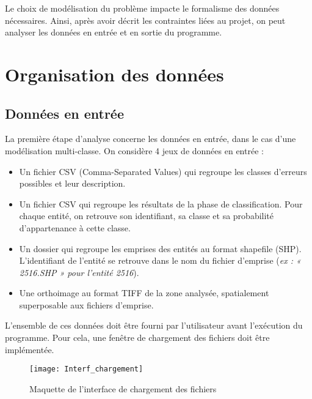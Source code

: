 Le choix de modélisation du problème impacte le formalisme des données nécessaires. Ainsi, après avoir décrit les contraintes liées au projet, on peut analyser les données en entrée et en sortie du programme.\newline

\section{Organisation des données}

\subsection{Données en entrée}

La première étape d'analyse concerne les données en entrée, dans le cas d'une modélisation multi-classe. On considère 4 jeux de données en entrée :
\begin{itemize}[label=$\rightarrow$]
	\item Un fichier CSV (Comma-Separated Values) qui regroupe les classes d’erreurs possibles et leur description.
	\item Un fichier CSV qui regroupe les résultats de la phase de classification. Pour chaque entité, on retrouve son identifiant, sa classe et sa probabilité d’appartenance à cette classe.
	\item Un dossier qui regroupe les emprises des entités au format shapefile (SHP). L’identifiant de l’entité se retrouve dans le nom du fichier d'emprise (\emph{ex : « 2516.SHP » pour l’entité 2516}).
	\item Une orthoimage au format TIFF de la zone analysée, spatialement superposable aux fichiers d’emprise.\newline
\end{itemize}

L’ensemble de ces données doit être fourni par l’utilisateur avant l’exécution du programme. Pour cela, une fenêtre de chargement des fichiers doit être implémentée. \newline

\begin{figure}[H]
	\begin{center}
		\texttt{[image: Interf\_chargement]}  \\
		\caption[Maquette de l'interface de chargement des fichiers]{Maquette de l'interface de chargement des fichiers}
		\label{fig:interfCharg}
	\end{center}
\end{figure}

